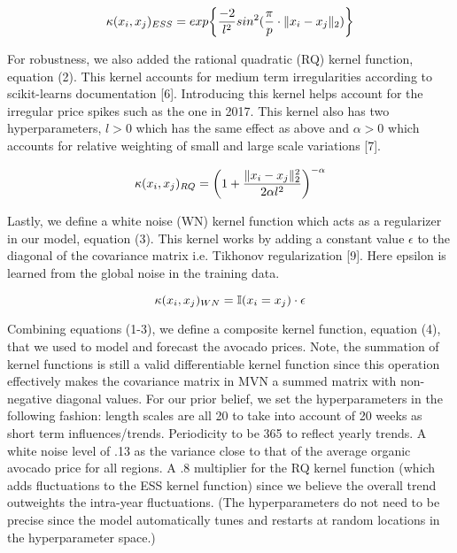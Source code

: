 \documentclass{article}
\begin{document}
\begin{equation}
\centering
\kappa(x_i, x_j)_{ESS} = exp\bigg\{\frac{-2}{l^2}sin^2(\frac{\pi}{p}\cdot \|x_i - x_j\|_2) \bigg\}
\end{equation}

For robustness, we also added the rational quadratic (RQ) kernel function, equation (2). This kernel accounts for medium term irregularities according to scikit-learns documentation [6]. Introducing this kernel helps account for the irregular price spikes such as the one in 2017. This kernel also has two hyperparameters, $l > 0$ which has the same effect as above and $\alpha > 0$ which accounts for relative weighting of small and large scale variations [7].

\begin{equation}
\centering
\kappa(x_i, x_j)_{RQ} = \bigg(1 + \frac{\|x_i - x_j\|_2^2}{2\alpha l^2}\bigg)^{-\alpha}
\end{equation}

Lastly, we define a white noise (WN) kernel function which acts as a regularizer in our model, equation (3). This kernel works by adding a constant value $\epsilon$ to the diagonal of the covariance matrix i.e. Tikhonov regularization [9]. Here epsilon is learned from the global noise in the training data.

\begin{equation}
\centering
\kappa(x_i, x_j)_{WN} = \mathbb{I}(x_i = x_j) \cdot \epsilon
\end{equation}

Combining equations (1-3), we define a composite kernel function, equation (4), that we used to model and forecast the avocado prices. Note, the summation of kernel functions is still a valid differentiable kernel function since this operation effectively makes the covariance matrix in MVN a summed matrix with non-negative diagonal values. For our prior belief, we set the hyperparameters in the following fashion: length scales are all 20 to take into account of 20 weeks as short term influences/trends. Periodicity to be 365 to reflect yearly trends. A white noise level of .13 as the variance close to that of the average organic avocado price for all regions. A .8 multiplier for the RQ kernel function (which adds fluctuations to the ESS kernel function) since we believe the overall trend outweights the intra-year fluctuations. (The hyperparameters do not need to be precise since the model automatically tunes and restarts at random locations in the hyperparameter space.)
\end{document}
